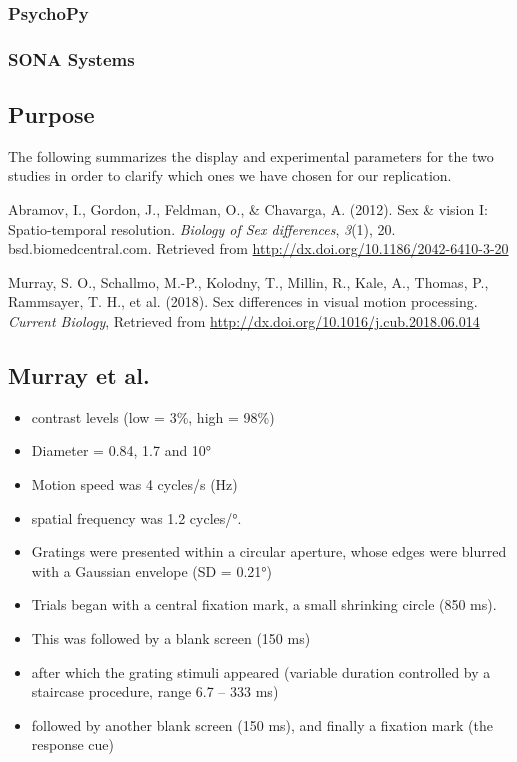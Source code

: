\documentclass[]{article}
\providecommand{\tightlist}{%
  \setlength{\itemsep}{0pt}\setlength{\parskip}{0pt}}
\begin{document}
\hypertarget{psychopy}{%
\subsubsection{PsychoPy}\label{psychopy}}

\hypertarget{sona-systems}{%
\subsubsection{SONA Systems}\label{sona-systems}}

\hypertarget{purpose-2}{%
\subsection{Purpose}\label{purpose-2}}

The following summarizes the display and experimental parameters for the
two studies in order to clarify which ones we have chosen for our
replication.

Abramov, I., Gordon, J., Feldman, O., \& Chavarga, A. (2012). Sex \&
vision I: Spatio-temporal resolution. \emph{Biology of Sex differences},
\emph{3}(1), 20. bsd.biomedcentral.com. Retrieved from
\url{http://dx.doi.org/10.1186/2042-6410-3-20}

Murray, S. O., Schallmo, M.-P., Kolodny, T., Millin, R., Kale, A.,
Thomas, P., Rammsayer, T. H., et al. (2018). Sex differences in visual
motion processing. \emph{Current Biology}, Retrieved from
\url{http://dx.doi.org/10.1016/j.cub.2018.06.014}

\hypertarget{murray-et-al.-1}{%
\subsection{Murray et al.}\label{murray-et-al.-1}}

\begin{itemize}
\tightlist
\item
  contrast levels (low = 3\%, high = 98\%)
\item
  Diameter = 0.84, 1.7 and 10°
\item
  Motion speed was 4 cycles/s (Hz)
\item
  spatial frequency was 1.2 cycles/°.
\item
  Gratings were presented within a circular aperture, whose edges were
  blurred with a Gaussian envelope (SD = 0.21°)
\item
  Trials began with a central fixation mark, a small shrinking circle
  (850 ms).
\item
  This was followed by a blank screen (150 ms)
\item
  after which the grating stimuli appeared (variable duration controlled
  by a staircase procedure, range 6.7 -- 333 ms)
\item
  followed by another blank screen (150 ms), and finally a fixation mark
  (the response cue)
\end{itemize}
\end{document}
